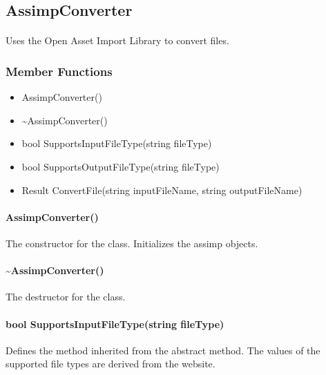 \hypertarget{fileconversion_assimpconverter}
{
    \label{fileconversion_assimpconverter}
}

\subsection{AssimpConverter}
    \paragraph{}
        Uses the Open Asset Import Library to convert files.

    \subsubsection{Member Functions}

        \begin{itemize}
            \item AssimpConverter()
            \item \textasciitilde AssimpConverter()
            \item bool SupportsInputFileType(string fileType)
            \item bool SupportsOutputFileType(string fileType)
            \item Result ConvertFile(string inputFileName, string outputFileName)
        \end{itemize}

        \paragraph{AssimpConverter()}
            \hfill \break
            The constructor for the class. Initializes the assimp objects.   
        
        \paragraph{\textasciitilde AssimpConverter()}
            \hfill \break
            The destructor for the class.

        \paragraph{bool SupportsInputFileType(string fileType)}
            \hfill \break
            Defines the method inherited from the abstract method.  The values of the supported file types are derived from the website.

